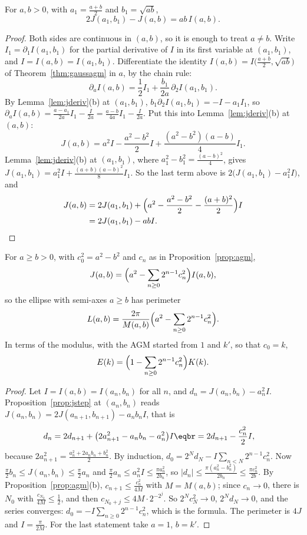 \begin{proposition}\label{prop:jstep}
For $a,b>0$, with $a_1=\frac{a+b}2$ and $b_1=\sqrt{ab}$,
\[
2J(a_1,b_1)-J(a,b)=ab\,I(a,b).
\]
\end{proposition}
\begin{proof}
Both sides are continuous in $(a,b)$, so it is enough to treat $a\ne b$. Write $I_1=\partial_1I(a_1,b_1)$ for the partial derivative of $I$ in its first variable at
$(a_1,b_1)$, and $I=I(a,b)=I(a_1,b_1)$. Differentiate the identity $I(a,b)=I\bigl(\frac{a+b}2,\sqrt{ab}\bigr)$ of Theorem~\ref{thm:gaussagm} in $a$, by the chain rule:
\[
\partial_aI(a,b)=\frac12I_1+\frac{b_1}{2a}\,\partial_2I(a_1,b_1).
\]
By Lemma~\ref{lem:jderiv}(b) at $(a_1,b_1)$, $b_1\partial_2I(a_1,b_1)=-I-a_1I_1$, so $\partial_aI(a,b)=\frac{a-a_1}{2a}I_1-\frac I{2a}=\frac{a-b}{4a}I_1-\frac I{2a}$. Put this
into Lemma~\ref{lem:jderiv}(b) at $(a,b)$:
\[
J(a,b)=a^2I-\frac{a^2-b^2}2I+\frac{(a^2-b^2)(a-b)}4I_1.
\]
Lemma~\ref{lem:jderiv}(b) at $(a_1,b_1)$, where $a_1^2-b_1^2=\frac{(a-b)^2}4$, gives $J(a_1,b_1)=a_1^2I+\frac{(a+b)(a-b)^2}8I_1$. So the last term above is
$2\bigl(J(a_1,b_1)-a_1^2I\bigr)$, and
\[
\begin{aligned}J(a,b)&=2J(a_1,b_1)+\Bigl(a^2-\frac{a^2-b^2}2-\frac{(a+b)^2}2\Bigr)I\\&=2J(a_1,b_1)-abI.\end{aligned}
\]
\end{proof}

\begin{theorem}\label{thm:perimeter}
For $a\ge b>0$, with $c_0^2=a^2-b^2$ and $c_n$ as in Proposition~\ref{prop:agm},
\[
J(a,b)=\Bigl(a^2-\sum_{n\ge0}2^{n-1}c_n^2\Bigr)I(a,b),
\]
so the ellipse with semi-axes $a\ge b$ has perimeter
\[
L(a,b)=\frac{2\pi}{M(a,b)}\Bigl(a^2-\sum_{n\ge0}2^{n-1}c_n^2\Bigr).
\]
In terms of the modulus, with the AGM started from $1$ and $k'$, so that $c_0=k$,
\[
E(k)=\Bigl(1-\sum_{n\ge0}2^{n-1}c_n^2\Bigr)K(k).
\]
\end{theorem}
\begin{proof}
Let $I=I(a,b)=I(a_n,b_n)$ for all $n$, and $d_n=J(a_n,b_n)-a_n^2I$. Proposition~\ref{prop:jstep} at $(a_n,b_n)$ reads $J(a_n,b_n)=2J(a_{n+1},b_{n+1})-a_nb_nI$, that is
\[
\begin{aligned}d_n&=2d_{n+1}+\bigl(2a_{n+1}^2-a_nb_n-a_n^2\bigr)I\eqbr=2d_{n+1}-\frac{c_n^2}2I,\end{aligned}
\]
because $2a_{n+1}^2=\frac{a_n^2+2a_nb_n+b_n^2}2$. By induction, $d_0=2^Nd_N-I\sum_{n<N}2^{n-1}c_n^2$. Now $\frac\pi2b_n\le J(a_n,b_n)\le\frac\pi2a_n$ and $\frac\pi2a_n\le a_n^2I\le\frac{\pi a_n^2}{2b_n}$, so $|d_n|\le\frac{\pi(a_n^2-b_n^2)}{2b_n}\le\frac{\pi c_n^2}{2b}$. By Proposition~\ref{prop:agm}(b), $c_{n+1}\le\frac{c_n^2}{4M}$ with $M=M(a,b)$; since $c_n\to0$, there is $N_0$ with $\frac{c_{N_0}}{4M}\le\frac12$, and then
$c_{N_0+j}\le4M\cdot2^{-2^j}$. So $2^Nc_N^2\to0$, $2^Nd_N\to0$, and the series converges: $d_0=-I\sum_{n\ge0}2^{n-1}c_n^2$, which is the formula. The perimeter is
$4J$ and $I=\frac\pi{2M}$. For the last statement take $a=1$, $b=k'$.
\end{proof}

